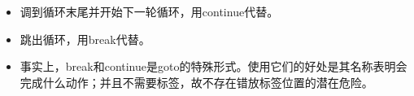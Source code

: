 \begin{frame}[fragile]\ft{\secname}
\begin{itemize}
\item 调到循环末尾并开始下一轮循环，用continue代替。\\[0.1in]
\item 跳出循环，用break代替。\\[0.1in]
\item 事实上，break和continue是goto的特殊形式。使用它们的好处是其名称表明会完成什么动作；并且不需要标签，故不存在错放标签位置的潜在危险。
\end{itemize}
\end{frame}
